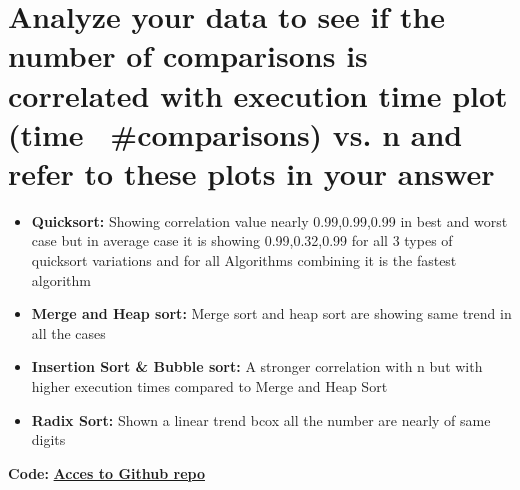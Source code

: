 \documentclass[a4paper,12pt]{article}
\begin{document}
	\section{Analyze your data to see if the number of comparisons is correlated with execution time plot (time \ \#comparisons) vs. n and refer to these plots in your answer}
	\begin{itemize}
		\item \textbf{Quicksort:} {Showing correlation value nearly 0.99,0.99,0.99 in best and worst case but in average case it is showing 0.99,0.32,0.99 for all 3 types of quicksort variations and for all Algorithms combining it is the fastest algorithm }
		\item \textbf{Merge and Heap sort:} {Merge sort and heap sort are showing same trend in all the cases}
		\item \textbf{Insertion Sort \& Bubble sort:} { A stronger correlation with 
			n but with higher execution times compared to Merge and Heap Sort}
		\item \textbf{Radix Sort:} {Shown a linear trend bcox all the number are nearly of same digits}
	\end{itemize}
	
	
	
	\vspace{1cm}
	
	\noindent \textbf{Code: }\textbf{\href{https://github.com/gdillu/DSA-Assignments/tree/main/1st-Assignments/}{Acces to Github repo}}
	
\end{document}
